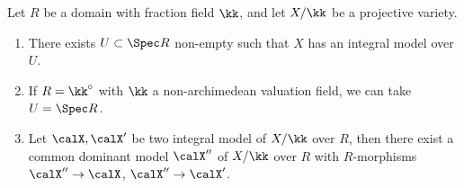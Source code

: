 \begin{proposition}[label=\labelNFM{prop:spreading-out-for-berkovich}, status=draft, tag=0000000]
	Let $R$ be a domain with fraction field $\kk$, and let $X/\kk$ be a projective variety.
	\begin{enumerate}
		\item There exists $U \subset \Spec R$ non-empty such that $X$ has an integral model over $U$.
		\item If $R = \kk^\circ$ with $\kk$ a non-archimedean valuation field, we can take $U = \Spec R$.
		\item Let $\calX,\calX'$ be two integral model of $X/\kk$ over $R$, then there exist a common dominant model $\calX''$ of $X/\kk$ over $R$ with $R$-morphisms $\calX'' \to \calX$, $\calX'' \to \calX'$.
	\end{enumerate}
	\Yang{}
\end{proposition}
